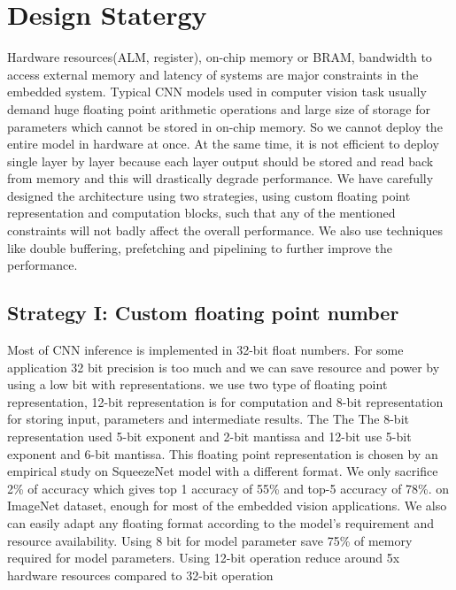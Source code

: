 \documentclass[conference]{IEEEtran}
\begin{document}
\section{Design Statergy}
Hardware resources(ALM, register), on-chip memory or BRAM, bandwidth to access external memory and latency of systems are major constraints in the embedded system. Typical CNN models used in computer vision task usually demand huge floating point arithmetic operations and large size of storage for parameters which cannot be stored in on-chip memory. So we cannot deploy the entire model in hardware at once. At the same time, it is not efficient to deploy single layer by layer because each layer output should be stored and read back from memory and this will drastically degrade performance. We have carefully designed the architecture using two strategies, using custom floating point representation and computation blocks, such that any of the mentioned constraints will not badly affect the overall performance.  We also use techniques like double buffering, prefetching and pipelining to further improve the performance.

\subsection{Strategy I: Custom floating point number
}\label{AA}
Most of CNN inference is implemented in 32-bit float numbers. For some application 32 bit precision is too much and we can save resource and power by using a low bit with representations. we use two type of floating point representation, 12-bit representation is for computation and 8-bit representation for storing input, parameters and intermediate results. The The The 8-bit representation used 5-bit exponent and 2-bit mantissa and 12-bit use 5-bit exponent and 6-bit mantissa. This floating point representation is chosen by an empirical study on SqueezeNet model with a different format. We only sacrifice 2\% of accuracy which gives top 1 accuracy of 55\% and top-5 accuracy of 78\%. on ImageNet dataset, enough for most of the embedded vision applications. We also can easily adapt any floating format according to the model’s requirement and resource availability. Using 8 bit for model parameter save 75\% of memory required for model parameters. Using 12-bit operation reduce around 5x hardware resources compared to 32-bit operation
\end{document}
